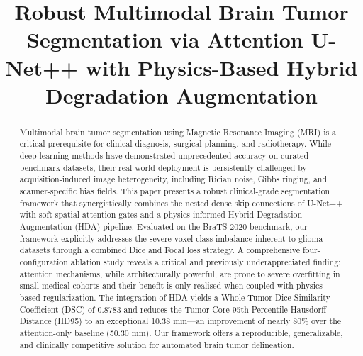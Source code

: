\documentclass[conference]{IEEEtran}
\begin{document}
\title{Robust Multimodal Brain Tumor Segmentation via Attention U-Net++ with Physics-Based Hybrid Degradation Augmentation}

\author{
}

\maketitle

\begin{abstract}
Multimodal brain tumor segmentation using Magnetic Resonance Imaging (MRI) is a critical prerequisite for clinical diagnosis, surgical planning, and radiotherapy. While deep learning methods have demonstrated unprecedented accuracy on curated benchmark datasets, their real-world deployment is persistently challenged by acquisition-induced image heterogeneity, including Rician noise, Gibbs ringing, and scanner-specific bias fields. This paper presents a robust clinical-grade segmentation framework that synergistically combines the nested dense skip connections of U-Net++ with soft spatial attention gates and a physics-informed Hybrid Degradation Augmentation (HDA) pipeline. Evaluated on the BraTS 2020 benchmark, our framework explicitly addresses the severe voxel-class imbalance inherent to glioma datasets through a combined Dice and Focal loss strategy. A comprehensive four-configuration ablation study reveals a critical and previously underappreciated finding: attention mechanisms, while architecturally powerful, are prone to severe overfitting in small medical cohorts and their benefit is only realised when coupled with physics-based regularization. The integration of HDA yields a Whole Tumor Dice Similarity Coefficient (DSC) of 0.8783 and reduces the Tumor Core 95th Percentile Hausdorff Distance (HD95) to an exceptional 10.38 mm—an improvement of nearly 80\% over the attention-only baseline (50.30 mm). Our framework offers a reproducible, generalizable, and clinically competitive solution for automated brain tumor delineation.
\end{abstract}
\end{document}
